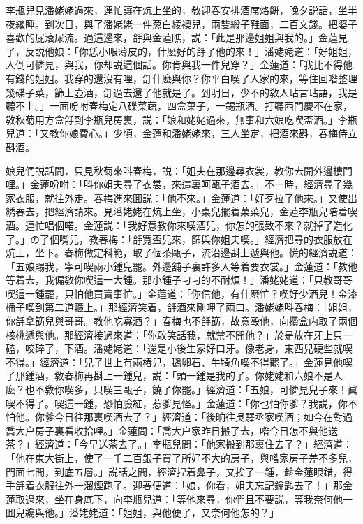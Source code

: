 李瓶兒見潘姥姥過來，連忙讓在炕上坐的，敎迎春安排酒席烙餅，晚夕説話，坐半夜纔睡。到次日，與了潘姥姥一件葱白綾襖兒，兩雙緞子鞋面，二百文錢。把婆子喜歡的屁滾尿流。過這邊來，㧱與金蓮瞧，説：「此是那邊姐姐與我的。」金蓮見了，反説他娘：「你恁小眼薄皮的，什麽好的㧱了他的來！」潘姥姥道：「好姐姐，人倒可憐見，與我，你却説這個話。你肯與我一件兒穿？」金蓮道：「我比不得他有錢的姐姐。我穿的還沒有哩，㧱什麽與你？你平白喫了人家的來，等住回喒整理幾碟子菜，篩上壺酒，㧱過去還了他就是了。到明日，少不的敎人玷言玷語，我是聽不上。」一面吩咐春梅定八碟菜蔬，四盒菓子，一錫瓶酒。打聽西門慶不在家，敎秋菊用方盒㧱到李瓶兒房裏，説：「娘和姥姥過來，無事和六娘吃喫盃酒。」李瓶兒道：「又教你娘費心。」少頃，金蓮和潘姥姥來，三人坐定，把酒來斟，春梅侍立斟酒。

娘兒們説話間，只見秋菊來呌春梅，説：「姐夫在那邊尋衣裳，教你去開外邊樓門哩。」金蓮吩咐：「呌你姐夫尋了衣裳，來這裏呵甌子酒去。」不一時，經濟尋了幾家衣服，就往外走。春梅進來囬説：「他不來。」金蓮道：「好歹拉了他來。」又使出綉春去，把經濟請來。見潘姥姥在炕上坐，小桌兒擺着菓菜兒，金蓮李瓶兒陪着喫酒。連忙唱個喏。金蓮説：「我好意教你來喫酒兒，你怎的張致不來？就掉了造化了。」の了個嘴兒，教春梅：「㧱寬盃兒來，篩與你姐夫喫。」經濟把尋的衣服放在炕上，坐下。春梅做定科範，取了個茶甌子，流沿邊斟上遞與他。慌的經濟説道：「五娘賜我，寜可喫兩小鍾兒罷。外邊舖子裏許多人等着要衣裳。」金蓮道：「教他等着去，我偏敎你喫這一大鍾。那小鍾子刁刁的不耐煩！」潘姥姥道：「只教哥哥喫這一鍾罷，只怕他買賣事忙。」金蓮道：「你信他，有什麽忙？喫好少酒兒！金漆桶子喫到第二道箍上。」那經濟笑着，㧱酒來剛呷了兩口。潘姥姥呌春梅：「姐姐，你㧱拿筯兒與哥哥。教他吃寡酒？」春梅也不㧱筯，故意毆他，向攢盒内取了兩個核桃遞與他。那經濟接過來道：「你敢笑話我，就禁不開他？」於是放在牙上只一磕，咬碎了，下酒。潘姥姥道：「還是小後生家好口牙。像老身，東西兒硬些就喫不得。」經濟道：「兒子世上有兩樁兒，鵝卵石、牛犄角喫不得罷了。」金蓮見他喫了那鍾酒，敎春梅再斟上一鍾兒，説：「頭一鍾是我的了。你姥姥和六娘不是人麽？也不敎你喫多，只喫三甌子，饒了你罷。」經濟道：「五娘，可憐見兒子來！眞喫不得了。喫這一鍾，恐怕臉紅，惹爹見怪。」金蓮道：「你也怕你爹？我説，你不怕他。你爹今日往那裏喫酒去了？」經濟道：「後晌往吳驛丞家喫酒；如今在對過喬大户房子裏看收拾哩。」金蓮問：「喬大户家昨日搬了去，喒今日怎不與他送茶？」經濟道：「今早送茶去了。」李瓶兒問：「他家搬到那裏住去了？」經濟道：「他在東大街上，使了一千二百銀子買了所好不大的房子，與喒家房子差不多兒，門面七間，到底五層。」説話之間，經濟捏着鼻子，又挨了一鍾，趁金蓮眼錯，得手㧱着衣服往外一溜煙跑了。迎春便道：「娘，你看，姐夫忘記鑰匙去了！」那金蓮取過來，坐在身底下，向李瓶兒道：「等他來尋，你們且不要説，等我奈何他一囬兒纔與他。」潘姥姥道：「姐姐，與他便了，又奈何他怎的？」

